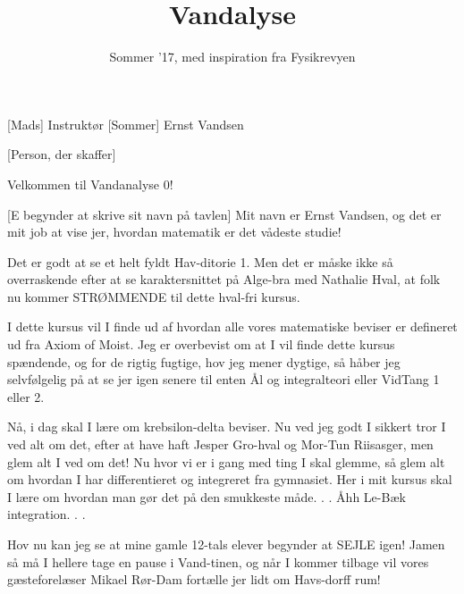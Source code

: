 \documentclass[a4paper,11pt]{article}
\title{Vandalyse}
\author{Sommer '17, med inspiration fra Fysikrevyen}
\begin{document}
\maketitle

\begin{roles}
[Mads] Instruktør
[Sommer] Ernst Vandsen
\end{roles}

\begin{props}
[Person, der skaffer]
\end{props}


\begin{sketch}


 Velkommen til Vandanalyse 0!

[E begynder at skrive sit navn på tavlen] Mit navn er Ernst Vandsen, og det er mit job at vise jer, hvordan matematik er det vådeste studie!

 Det er godt at se et helt fyldt Hav-ditorie 1. Men det er måske ikke så overraskende efter at se karaktersnittet på Alge-bra med Nathalie Hval, at folk nu kommer STRØMMENDE til dette hval-fri kursus.

 I dette kursus vil I finde ud af hvordan alle vores matematiske beviser er defineret ud fra Axiom of Moist. Jeg er overbevist om at I vil finde dette kursus spændende, og for de rigtig fugtige, hov jeg mener dygtige, så håber jeg selvfølgelig på at se jer igen senere til enten Ål og integralteori eller VidTang 1 eller 2.

 Nå, i dag skal I lære om krebsilon-delta beviser. Nu ved jeg godt I sikkert tror I ved alt om det, efter at have haft Jesper Gro-hval og Mor-Tun Riisasger, men glem alt I ved om det! Nu hvor vi er i gang med ting I skal glemme, så glem alt om hvordan I har differentieret og integreret fra gymnasiet. Her i mit kursus skal I lære om hvordan man gør det på den smukkeste måde. . . Åhh Le-Bæk integration. . .


 Hov nu kan jeg se at mine gamle 12-tals elever begynder at SEJLE igen! Jamen så må I hellere tage en pause i Vand-tinen, og når I kommer tilbage vil vores gæsteforelæser Mikael Rør-Dam fortælle jer lidt om Havs-dorff rum!

\end{sketch}
\end{document}
